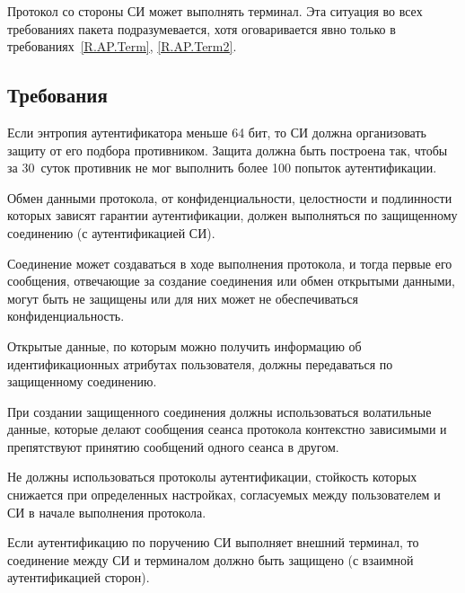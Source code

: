 Протокол со стороны СИ может выполнять терминал. Эта ситуация во всех  
требованиях пакета подразумевается, хотя оговаривается явно только в 
требованиях~\ref{R.AP.Term}, \ref{R.AP.Term2}. 

\subsection{Требования}\label{AP.Reqs}

\label{Req.AP.Attempts}
Если энтропия аутентификатора меньше 64 бит, то СИ должна организовать защиту 
от его подбора противником. Защита должна быть построена так, чтобы за 
30~суток противник не мог выполнить более 100 попыток аутентификации.

Обмен данными протокола, от конфиденциальности, целостности и подлинности 
которых зависят гарантии аутентификации, должен выполняться по защищенному 
соединению (с аутентификацией СИ).

\begin{note*}
Соединение может создаваться в ходе выполнения протокола, и тогда
первые его сообщения, отвечающие за создание соединения или обмен открытыми 
данными, могут быть не защищены или для них может не обеспечиваться 
конфиденциальность.
\end{note*}


Открытые данные, по которым можно получить информацию об идентификационных 
атрибутах пользователя, должны передаваться по защищенному соединению.


При создании защищенного соединения должны использоваться волатильные данные,
которые делают сообщения сеанса протокола контекстно зависимыми и препятствуют 
принятию сообщений одного сеанса в другом.


Не должны использоваться протоколы аутентификации, стойкость
которых снижается при определенных настройках, согласуемых между
пользователем и СИ в начале выполнения протокола.


\label{R.AP.Term}
Если аутентификацию по поручению СИ выполняет внешний терминал, то 
соединение между СИ и терминалом должно быть защищено (с взаимной 
аутентификацией сторон).


